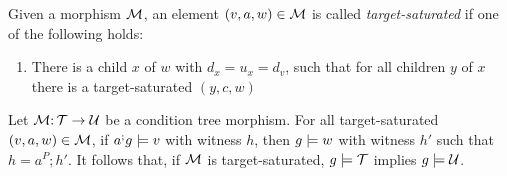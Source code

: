 Given a morphism ${\mathcal{M}}$, an element $(v,a,w)\in {\mathcal{M}}$ is called \emph{target-saturated} if one of the following holds:

\begin{enumerate}[label=(\alph*)]
\item There is a child $x$ of $w$ with $d_x=u_x=d_v$, such that for all children $y$ of $x$ there is a target-saturated $(y,c,w)$
\end{enumerate}

\begin{lemma}
Let ${\mathcal{M}}{:}\,{\mathcal{T}}\rightarrow{\mathcal{U}}$ be a condition tree morphism. For all target-saturated $(v,a,w)\in {\mathcal{M}}$, if $a^;g\models v$ with witness $h$, then $g\models w$ with witness $h'$ such that $h=a^P;h'$. It follows that, if ${\mathcal{M}}$ is target-saturated, $g\models{\mathcal{T}}$ implies $g\models{\mathcal{U}}$.
\end{lemma}

